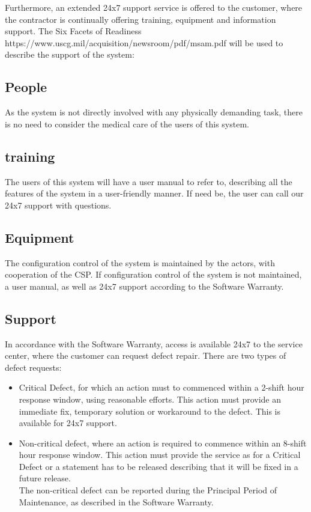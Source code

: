 \noindent Furthermore, an extended 24x7 support service is offered to the customer, where the contractor is continually offering training, equipment and information support.
The Six Facets of Readiness \citep{Six_facets} https://www.uscg.mil/acquisition/newsroom/pdf/msam.pdf will be used to describe the support of the system:

\subsection{People}
As the system is not directly involved with any physically demanding task, there is no need to consider the medical care of the users of this system.

\subsection{training}
The users of this system will have a user manual to refer to, describing all the features of the system in a user-friendly manner. If need be, the user can call our 24x7 support with questions.

\subsection{Equipment}
The configuration control of the system is maintained by the actors, with cooperation of the CSP. If configuration control of the system is not maintained, a user manual, as well as 24x7 support according to the Software Warranty. 

\subsection{Support}
In accordance with the Software Warranty, access is available 24x7 to the service center, where the customer can request defect repair. There are two types of defect requests:
\begin{itemize}
	\itemsep0em
	\item Critical Defect, for which an action must to commenced within a 2-shift hour response window, using reasonable efforts. This action must provide an immediate fix, temporary solution or workaround to the defect. This is available for 24x7 support.
	\item Non-critical defect, where an action is required to commence within an 8-shift hour response window. This action must provide the service as for a Critical Defect or a statement has to be released describing that it will be fixed in a future release. \\
	The non-critical defect can be reported during the Principal Period of Maintenance, as described in the Software Warranty.
\end{itemize}

